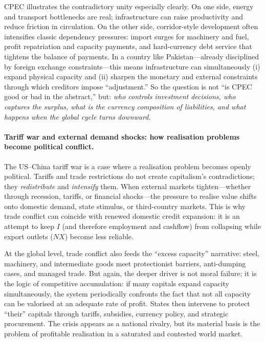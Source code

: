 CPEC illustrates the contradictory unity especially clearly.
On one side, energy and transport bottlenecks are real; infrastructure can raise productivity
and reduce friction in circulation.
On the other side, corridor-style development often intensifies classic dependency pressures:
import surges for machinery and fuel, profit repatriation and capacity payments,
and hard-currency debt service that tightens the balance of payments.\cite{IMFPakistan2023}
In a country like Pakistan---already disciplined by foreign exchange constraints---this means
infrastructure can simultaneously (i) expand physical capacity and (ii) sharpen the monetary
and external constraints through which creditors impose “adjustment.”
So the question is not “is CPEC good or bad in the abstract,” but:
\emph{who controls investment decisions, who captures the surplus, what is the currency
composition of liabilities, and what happens when the global cycle turns downward.}

\paragraph{Tariff war and external demand shocks: how realisation problems become political conflict.}
The US--China tariff war is a case where a realisation problem becomes openly political.
Tariffs and trade restrictions do not create capitalism’s contradictions; they \emph{redistribute}
and \emph{intensify} them.
When external markets tighten---whether through recession, tariffs, or financial shocks---the
pressure to realise value shifts onto domestic demand, state stimulus, or third-country
markets.
This is why trade conflict can coincide with renewed domestic credit expansion:
it is an attempt to keep $I$ (and therefore employment and cashflow) from collapsing
while export outlets ($NX$) become less reliable.

At the global level, trade conflict also feeds the “excess capacity” narrative:
steel, machinery, and intermediate goods meet protectionist barriers, anti-dumping cases,
and managed trade.
But again, the deeper driver is not moral failure; it is the logic of competitive accumulation:
if many capitals expand capacity simultaneously, the system periodically confronts the fact
that not all capacity can be valorised at an adequate rate of profit.
States then intervene to protect “their” capitals through tariffs, subsidies, currency policy,
and strategic procurement.
The crisis appears as a national rivalry, but its material basis is the problem of profitable
realisation in a saturated and contested world market.

